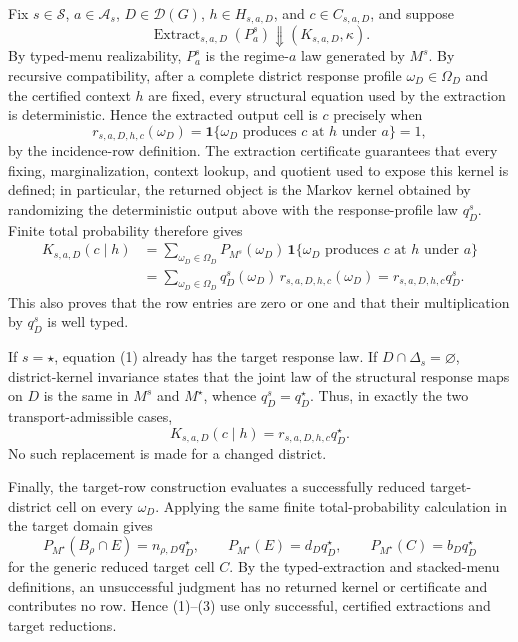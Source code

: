 Fix \(s\in\mathcal S\), \(a\in\mathcal A_s\), \(D\in\mathcal D(G)\), \(h\in H_{s,a,D}\), and \(c\in C_{s,a,D}\), and suppose
\[
\operatorname{Extract}_{s,a,D}(P_a^s)\Downarrow(K_{s,a,D},\kappa).
\]
By typed-menu realizability, \(P_a^s\) is the regime-\(a\) law generated by \(M^s\). By recursive compatibility, after a complete district response profile \(\omega_D\in\Omega_D\) and the certified context \(h\) are fixed, every structural equation used by the extraction is deterministic. Hence the extracted output cell is \(c\) precisely when
\[
r_{s,a,D,h,c}(\omega_D)
=\mathbf 1\{\omega_D\text{ produces }c\text{ at }h\text{ under }a\}=1,
\]
by the incidence-row definition. The extraction certificate guarantees that every fixing, marginalization, context lookup, and quotient used to expose this kernel is defined; in particular, the returned object is the Markov kernel obtained by randomizing the deterministic output above with the response-profile law \(q_D^s\). Finite total probability therefore gives
\[
\begin{aligned}
K_{s,a,D}(c\mid h)
&=\sum_{\omega_D\in\Omega_D}
 P_{M^s}(\omega_D)\,\mathbf 1\{\omega_D\text{ produces }c\text{ at }h\text{ under }a\}\\
&=\sum_{\omega_D\in\Omega_D}q_D^s(\omega_D)\,
r_{s,a,D,h,c}(\omega_D)
=r_{s,a,D,h,c}q_D^s.
\end{aligned}\tag{1}
\]
This also proves that the row entries are zero or one and that their multiplication by \(q_D^s\) is well typed.

If \(s=\star\), equation (1) already has the target response law. If \(D\cap\Delta_s=\varnothing\), district-kernel invariance states that the joint law of the structural response maps on \(D\) is the same in \(M^s\) and \(M^\star\), whence \(q_D^s=q_D^\star\). Thus, in exactly the two transport-admissible cases,
\[
K_{s,a,D}(c\mid h)=r_{s,a,D,h,c}q_D^\star.\tag{2}
\]
No such replacement is made for a changed district.

Finally, the target-row construction evaluates a successfully reduced target-district cell on every \(\omega_D\). Applying the same finite total-probability calculation in the target domain gives
\[
P_{M^\star}(B_\rho\cap E)=n_{\rho,D}q_D^\star,\qquad
P_{M^\star}(E)=d_Dq_D^\star,\qquad
P_{M^\star}(C)=b_Dq_D^\star\tag{3}
\]
for the generic reduced target cell \(C\). By the typed-extraction and stacked-menu definitions, an unsuccessful judgment has no returned kernel or certificate and contributes no row. Hence (1)--(3) use only successful, certified extractions and target reductions.